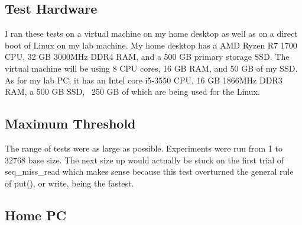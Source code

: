 \documentclass[twocolumn,11pt]{article}
\begin{document}
\subsection{Test Hardware}
\label{subsec:test_hw}

I ran these tests on a virtual machine on my home desktop as well as on a direct
boot of Linux on my lab machine. My home desktop has a AMD Ryzen R7 1700 CPU, 32
GB 3000MHz DDR4 RAM, and a 500 GB primary storage SSD. The virtual machine will
be using 8 CPU cores, 16 GB RAM, and 50 GB of my SSD. As for my lab PC, it has
an Intel core i5-3550 CPU, 16 GB 1866MHz DDR3 RAM, a 500 GB SSD, ~250 GB of
which are being used for the Linux.

\subsection{Maximum Threshold}
\label{subsec:max_threshold}

The range of tests were as large as possible. Experiments were run from 1 to
32768 base size. The next size up would actually be stuck on the first trial of
seq\_miss\_read which makes sense because this test overturned the general rule of
put(), or write, being the fastest.

\subsection{Home PC}
\end{document}
